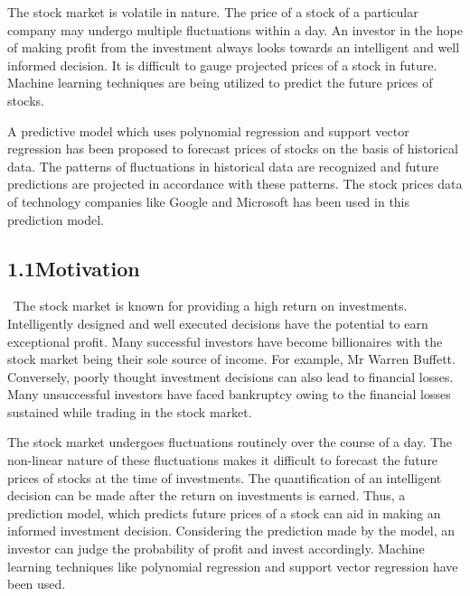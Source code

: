 \documentclass[12pt]{article}
\begin{document}
\begin{justify}
The stock market is volatile in nature. The price of a stock of a particular company may undergo multiple fluctuations within a day. An investor in the hope of making profit from the investment always looks towards an intelligent and well informed decision. It is difficult to gauge projected prices of a stock in future. Machine learning techniques are being utilized to predict the future prices of stocks.
\end{justify}\par

\begin{justify}
A predictive model which uses polynomial regression and support vector regression has been proposed to forecast prices of stocks on the basis of historical data. The patterns of fluctuations in historical data are recognized and future predictions are projected in accordance with these patterns. The stock prices data of technology companies like Google and Microsoft has been used in this prediction model.
\end{justify}\par


\vspace{\baselineskip}
\subsection*{1.1\hspace*{10pt}Motivation}
\begin{justify}
\ The stock market is known for providing a high return on investments. Intelligently designed and well executed decisions have the potential to earn exceptional profit. Many successful  investors have become billionaires with the stock market being their sole source of income. For example, Mr Warren Buffett. Conversely, poorly thought investment decisions can also lead to financial losses. Many unsuccessful investors have faced bankruptcy owing to the financial losses sustained while trading in the stock market.
\end{justify}\par

\begin{justify}
The stock market undergoes fluctuations routinely over the course of a day. The non-linear nature of these fluctuations makes it difficult to forecast the future prices of stocks at the time of investments. The quantification of an intelligent decision can be made after the return on investments is earned. Thus, a prediction model, which predicts future prices of a stock can aid in making an informed investment decision. Considering the prediction made by the model, an investor can judge the probability of profit and invest accordingly. Machine learning techniques like polynomial regression and support vector regression have been used.
\end{justify}\par
\end{document}
